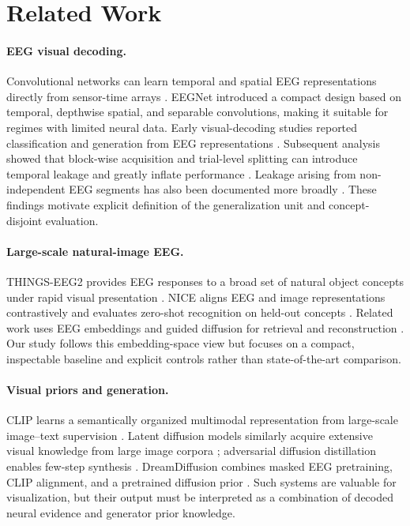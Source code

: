 \documentclass[10pt]{article}
\begin{document}
\section{Related Work}

\paragraph{EEG visual decoding.}
Convolutional networks can learn temporal and spatial EEG representations
directly from sensor-time arrays \cite{schirrmeister2017deep}. EEGNet
\cite{lawhern2018eegnet} introduced a compact design based on temporal,
depthwise spatial, and separable convolutions, making it suitable for regimes
with limited neural data. Early visual-decoding studies reported
classification and generation from EEG representations
\cite{spampinato2017humanmind,kavasidis2017brain2image,
palazzo2017gan_brain,palazzo2021multimodal}. Subsequent analysis showed that
block-wise acquisition and trial-level splitting can introduce temporal
leakage and greatly inflate performance \cite{li2019training_test_set}.
Leakage arising from non-independent EEG segments has also been documented
more broadly \cite{brookshire2024leakage}. These findings motivate explicit
definition of the generalization unit and concept-disjoint evaluation.

\paragraph{Large-scale natural-image EEG.}
THINGS-EEG2 provides EEG responses to a broad set of natural object concepts
under rapid visual presentation \cite{gifford2022things_eeg2}. NICE aligns EEG
and image representations contrastively and evaluates zero-shot recognition
on held-out concepts \cite{song2024nice}. Related work uses EEG embeddings and
guided diffusion for retrieval and reconstruction
\cite{li2024visual_decoding}. Our study follows this embedding-space view but
focuses on a compact, inspectable baseline and explicit controls rather than
state-of-the-art comparison.

\paragraph{Visual priors and generation.}
CLIP learns a semantically organized multimodal representation from
large-scale image--text supervision \cite{radford2021clip}. Latent diffusion
models similarly acquire extensive visual knowledge from large image corpora
\cite{rombach2022latentdiffusion}; adversarial diffusion distillation enables
few-step synthesis \cite{sauer2023add}. DreamDiffusion combines masked EEG
pretraining, CLIP alignment, and a pretrained diffusion prior
\cite{bai2024dreamdiffusion}. Such systems are valuable for visualization, but
their output must be interpreted as a combination of decoded neural evidence
and generator prior knowledge.
\end{document}
